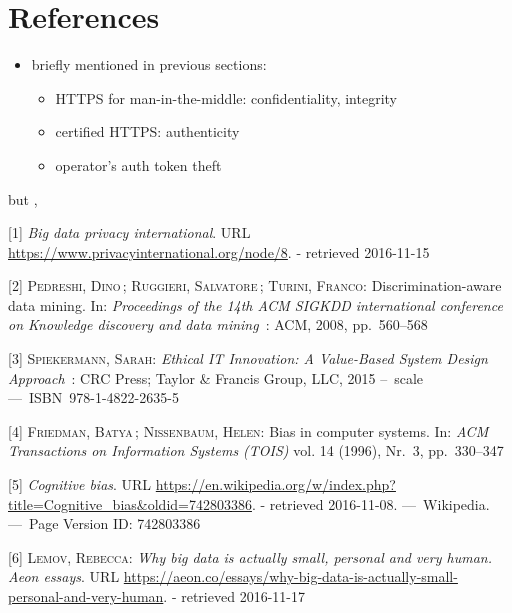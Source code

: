 \documentclass[12pt,english,a4paper,titlepage,cleardoublepage=empty,dottedtoc]{report}
\providecommand{\tightlist}{%
  \setlength{\itemsep}{0pt}\setlength{\parskip}{0pt}}
\begin{document}
\chapter*{References}\label{references}

\begin{itemize}
\tightlist
\item
  briefly mentioned in previous sections:

  \begin{itemize}
  \tightlist
  \item
    HTTPS for man-in-the-middle: confidentiality, integrity
  \item
    certified HTTPS: authenticity
  \item
    operator's auth token theft
  \end{itemize}
\end{itemize}

but ,

\hypertarget{refs}{}
\hypertarget{ref-web_2016_privacy-international-about-big-data}{}
{[}1{]} \emph{Big data privacy international}. URL
\url{https://www.privacyinternational.org/node/8}. - retrieved
2016-11-15

\hypertarget{ref-paper_2008_discrimination-aware-data-mining}{}
{[}2{]} \textsc{Pedreshi, Dino}\,; \textsc{Ruggieri, Salvatore}\,;
\textsc{Turini, Franco}: Discrimination-aware data mining. In:
\emph{Proceedings of the 14th ACM SIGKDD international conference on
Knowledge discovery and data mining}~: ACM, 2008, pp.~560--568

\hypertarget{ref-book_2015_ethical-it-innovation_ethical-uses-of-information-and-knowledge}{}
{[}3{]} \textsc{Spiekermann, Sarah}: \emph{Ethical IT Innovation: A
Value-Based System Design Approach}~: CRC Press; Taylor \& Francis
Group, LLC, 2015 --~scale ---~ISBN~978-1-4822-2635-5

\hypertarget{ref-paper_1996_bias-in-computer-systems}{}
{[}4{]} \textsc{Friedman, Batya}\,; \textsc{Nissenbaum, Helen}: Bias in
computer systems. In: \emph{ACM Transactions on Information Systems
(TOIS)} vol. 14 (1996), Nr.~3, pp.~330--347

\hypertarget{ref-wikipedia_2016_cognitive-bias}{}
{[}5{]} \emph{Cognitive bias}. URL
\url{https://en.wikipedia.org/w/index.php?title=Cognitive_bias\&oldid=742803386}.
- retrieved 2016-11-08. ---~Wikipedia. ---~Page Version ID: 742803386

\hypertarget{ref-web_2016_big-data-is-people}{}
{[}6{]} \textsc{Lemov, Rebecca}: \emph{Why big data is actually small,
personal and very human. Aeon essays}. URL
\url{https://aeon.co/essays/why-big-data-is-actually-small-personal-and-very-human}.
- retrieved 2016-11-17
\end{document}
